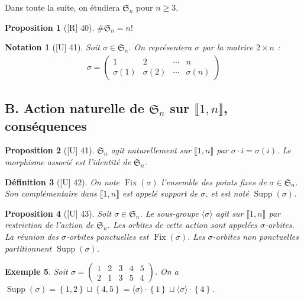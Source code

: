 \documentclass[10pt, a4paper, parskip=full, twoside, twocolumn]{report}
\newtheorem{definition}{Définition}
\newtheorem{proposition}[definition]{Proposition}
\newtheorem{example}[definition]{Exemple}
\newtheorem*{notation*}{Notation}
\DeclareMathOperator{\Fix}{Fix}
\DeclareMathOperator{\Supp}{Supp}
\begin{document}
Dans toute la suite, on étudiera $\mathfrak{S}_n$ pour $n\geq 3$.

\begin{proposition}[\textnormal{[R] 40}]
	$\#\mathfrak{S}_n = n!$
\end{proposition}

\begin{notation*}[\textnormal{[U] 41}]
	Soit $\sigma\in\mathfrak{S}_n$. On représentera $\sigma$ par la matrice $2\times n$ :
	\begin{align*}
		\sigma = \left(\begin{smallmatrix} 
			1 & 2 & \cdots & n\\
			\sigma(1) & \sigma(2) & \cdots & \sigma(n)
		\end{smallmatrix}\right)
	\end{align*}
\end{notation*}

\subsection*{B. Action naturelle de $\mathfrak{S}_n$ sur $\llbracket 1,n\rrbracket$, conséquences}

\begin{proposition}[\textnormal{[U] 41}]
		$\mathfrak{S}_n$ agit naturellement sur $\llbracket 1,n\rrbracket$ par $\sigma \cdot i = \sigma(i)$.
		Le morphisme associé est l'identité de $\mathfrak{S}_n$.
\end{proposition}

\begin{definition}[\textnormal{[U] 42}]
	On note $\Fix(\sigma)$ l'ensemble des points fixes de $\sigma\in\mathfrak{S}_n$.
	Son complémentaire dans $\llbracket 1,n\rrbracket$ est appelé \emph{support} de $\sigma$, et est noté $\Supp(\sigma)$.
\end{definition}

\begin{proposition}[\textnormal{[U] 43}]
	Soit $\sigma \in \mathfrak{S}_n$. Le sous-groupe $\langle\sigma\rangle$ agit sur $\llbracket 1,n\rrbracket$ par restriction
	de l'action de $\mathfrak{S}_n$. Les orbites de cette action sont appelées \emph{$\sigma$-orbites}.
	La réunion des $\sigma$-orbites ponctuelles est $\Fix(\sigma)$. Les $\sigma$-orbites non ponctuelles partitionnent $\Supp(\sigma)$.
\end{proposition}

\begin{example}
	Soit $\sigma = \left(\begin{smallmatrix} 
			1 & 2 & 3 & 4 & 5 \\
			2 & 1 & 3 & 5 & 4
		\end{smallmatrix}\right)$.
	On a $\Supp(\sigma)=\left\{1,2\right\}\sqcup \left\{4,5\right\}=\langle\sigma\rangle\cdot \left\{1\right\}\sqcup \langle\sigma\rangle\cdot\left\{4\right\}$.
\end{example}
\end{document}
